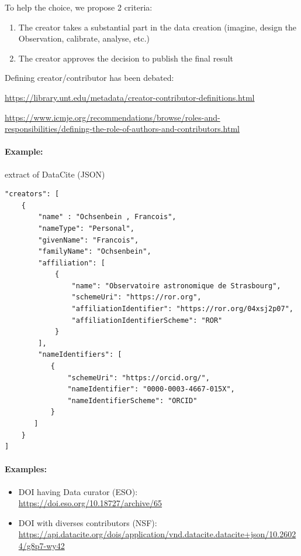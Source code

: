 \documentclass[11pt,a4paper]{ivoa}
\begin{document}
To help the choice, we propose 2 criteria:

\begin{enumerate}
\item{} The creator takes a substantial part in  the data creation (imagine, design the Observation, calibrate, analyse, etc.)
\item{} The creator approves the decision to publish the final result
\end{enumerate}

Defining creator/contributor has been debated:

\href{https://library.unt.edu/metadata/creator-contributor-definitions.html}{https://library.unt.edu/metadata/creator-contributor-definitions.html}

\href{https://www.icmje.org/recommendations/browse/roles-and-responsibilities/defining-the-role-of-authors-and-contributors.html}{https://www.icmje.org/recommendations/browse/roles-and-responsibilities/defining-the-role-of-authors-and-contributors.html}

\paragraph{Example:} extract of DataCite (JSON)

\begin{lstlisting}
"creators": [
    {
        "name" : "Ochsenbein , Francois",
        "nameType": "Personal",
        "givenName": "Francois",
        "familyName": "Ochsenbein",
        "affiliation": [
            {
                "name": "Observatoire astronomique de Strasbourg",
                "schemeUri": "https://ror.org",
                "affiliationIdentifier": "https://ror.org/04xsj2p07",
                "affiliationIdentifierScheme": "ROR"
            }
        ],
        "nameIdentifiers": [
           {
               "schemeUri": "https://orcid.org/",
               "nameIdentifier": "0000-0003-4667-015X",
               "nameIdentifierScheme": "ORCID"
           }
       ]
    }
]
\end{lstlisting}

\paragraph{Examples:}
\begin{itemize}
\item DOI having Data curator (ESO):\\ \url{https://doi.eso.org/10.18727/archive/65}

\item DOI with diverses contributors (NSF): \\ \url{https://api.datacite.org/dois/application/vnd.datacite.datacite+json/10.26024/g8p7-wy42}

\end{itemize}
\end{document}
